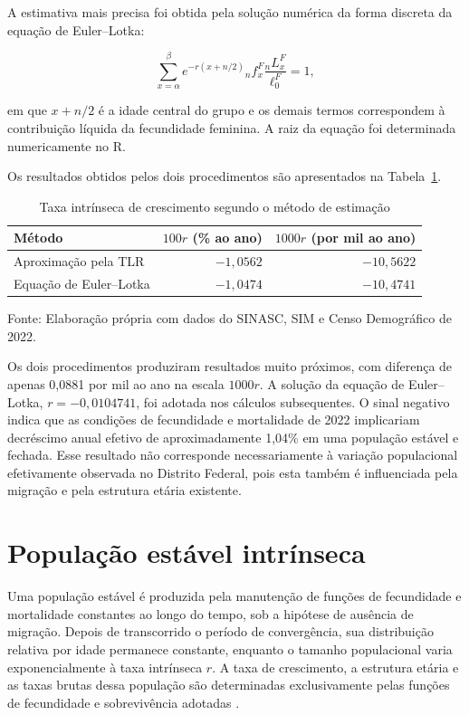 \documentclass[a4paper,12pt]{article}
\newcommand{\fonte}[1]{\par\noindent\footnotesize Fonte: #1}
\begin{document}
A estimativa mais precisa foi obtida pela solução numérica da forma discreta da equação de Euler--Lotka:

\begin{equation}
\sum_{x=\alpha}^{\beta}
e^{-r\left(x+n/2\right)}
{}_nf_x^F
\frac{{}_nL_x^F}{\ell_0^F}=1,
\end{equation}

\noindent em que \(x+n/2\) é a idade central do grupo e os demais termos correspondem à contribuição líquida da fecundidade feminina. A raiz da equação foi determinada numericamente no R.

Os resultados obtidos pelos dois procedimentos são apresentados na Tabela~\ref{tab:r_intrinseco}.

\begin{table}[H]
\centering
\caption{Taxa intrínseca de crescimento segundo o método de estimação}
\label{tab:r_intrinseco}
\begin{tabular}{lrr}
\toprule
Método & $100r$ (\% ao ano) & $1000r$ (por mil ao ano) \\  
\midrule
Aproximação pela TLR & $-1{,}0562$ & $-10{,}5622$ \\
Equação de Euler--Lotka & $-1{,}0474$ & $-10{,}4741$ \\
\bottomrule
\end{tabular}


\vspace{0.2cm}
\fonte{Elaboração própria com dados do SINASC, SIM e Censo Demográfico de 2022.}


\end{table}

Os dois procedimentos produziram resultados muito próximos, com diferença de apenas 0,0881 por 
mil ao ano na escala \(1000r\). A solução da equação de Euler--Lotka, \(r=-0{,}0104741\), foi adotada nos cálculos 
subsequentes. O sinal negativo indica que as condições de fecundidade e mortalidade de 2022 
implicariam decréscimo anual efetivo de aproximadamente 1,04\% em uma população estável e fechada. 
Esse resultado não corresponde necessariamente à variação populacional efetivamente observada 
no Distrito Federal, pois esta também é influenciada pela migração e pela estrutura etária 
existente.


\section{População estável intrínseca}

Uma população estável é produzida pela manutenção de funções de fecundidade e mortalidade constantes ao longo do tempo, sob a hipótese de ausência de migração. Depois de transcorrido o período de convergência, sua distribuição relativa por idade permanece constante, enquanto o tamanho populacional varia exponencialmente à taxa intrínseca \(r\). A taxa de crescimento, a estrutura etária e as taxas brutas dessa população são determinadas exclusivamente pelas funções de fecundidade e sobrevivência adotadas \cite{grupofoz2021,preston2001}.
\end{document}
